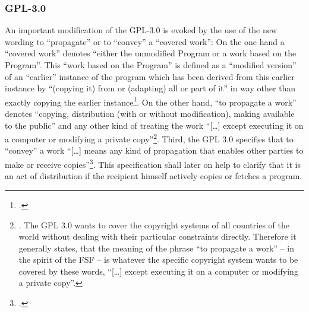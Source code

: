 \subsubsection {GPL-3.0}\label{subsec:ProtectingPowerOfGpl30}

An important modification of the GPL-3.0 is evoked by the use of the new wording
to \enquote{propagate} or to \enquote{convey} a \enquote{covered work}: On the
one hand a \enquote{covered work} denotes \enquote{either the unmodified Program
or a work based on the Program}. This \enquote{work based on the Program} is
defined as a \enquote{modified version} of an \enquote{earlier} instance of the
program which has been derived from this earlier instance by \enquote{(copying
it) from or (adapting) all or part of it} in way other than exactly copying the
earlier instance\footcite[cf.][\nopage wp. §0]{Gpl30OsiLicense2007a}. On the
other hand, \enquote{to propagate a work} denotes \enquote{copying, distribution
(with or without modification), making available to the public} and any other
kind of treating the work \enquote{[\ldots] except executing it on a computer or
modifying a private copy}\footnote{\cite[cf.][\nopage wp.
§0]{Gpl30OsiLicense2007a}. The GPL 3.0 wants to cover the copyright systems of
all countries of the world without dealing with their particular constraints
directly. Therefore it generally states, that the meaning of the phrase
\enquote{to propagate a work} -- in the spirit of the FSF -- is whatever the
specific copyright system wants to be covered by these words, \enquote{[\ldots]
except executing it on a computer or modifying a private copy}.}. Third, the GPL
3.0 specifies that to \enquote{convey} a work \enquote{[\ldots] means any kind
of propagation that enables other parties to make or receive
copies}\footcite[cf.][\nopage wp. §0]{Gpl30OsiLicense2007a}. This specification
shall later on help to clarify that it is an act of distribution if the recipient
himself actively copies or fetches a program.

